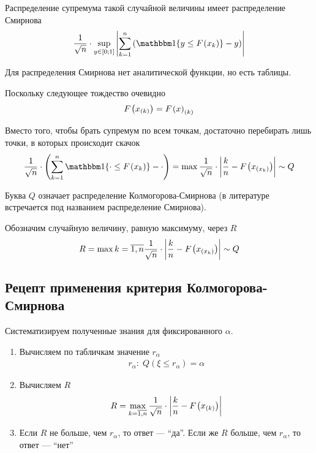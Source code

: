 Распределение супремума такой случайной величины имеет распределение Смирнова
\begin{align*}
    \frac{1}{\sqrt{n}} \cdot \sup\limits_{y \in \left[ 0; 1 \right]}
        {\left| \sum_{k=1}^{n} \left( \Indicator{y \le \cdf{x_k}} - y  \right)
        \right|}
\end{align*}

Для распределения Смирнова нет аналитической функции, но есть таблицы.

Поскольку следующее тождество очевидно
\begin{align*}
    F_{}\left(x_{\left( k \right)}\right) = F_{}\left(x\right)_{\left( k \right)}
\end{align*}

Вместо того, чтобы брать супремум по всем точкам, достаточно перебирать лишь
точки, в которых происходит скачок
\begin{align*}
    \frac{1}{\sqrt{n}} \cdot \left(
        \sum_{k=1}^{n}\Indicator{\cdot \le \cdf{x_k}} - \cdot \right)
    = \max{\frac{1}{\sqrt{n}} \cdot \left| \frac{k}{n}
        - \cdf{x_{\left( x_k \right)}} \right|}
    \sim Q
\end{align*}

Буква $Q$ означает распределение Колмогорова-Смирнова (в литературе встречается
под названием распределение Смирнова).

Обозначим случайную величину, равную максимуму, через $R$
\begin{align*}
    R = \max\limits{k=\overline{1,n}}{
        \frac{1}{\sqrt{n}} \cdot \left| \frac{k}{n}
            - F_{}\left(x_{\left( x_k \right)}\right) \right|}
    \sim Q
\end{align*}

\subsection{Рецепт применения критерия Колмогорова-Смирнова}

Систематизируем полученные знания для фиксированного $\alpha$.

\begin{enumerate}
    \item Вычисляем по табличкам значение $r_{\alpha}$
        \begin{align*}
            r_{\alpha}:\; Q\left( \xi \le r_{\alpha} \right) = \alpha
        \end{align*}
    \item Вычисляем $R$
        \begin{align*}
            R = \max\limits_{k=\overline{1,n}}{
                \frac{1}{\sqrt{n}} \cdot \left| \frac{k}{n}
                    - F_{}\left(x_{\left( k \right)}\right) \right|}
        \end{align*}
    \item Если $R$ не больше, чем $r_{\alpha}$, то ответ --- ``да''.
        Если же $R$ больше, чем $r_{\alpha}$, то ответ --- ``нет''
\end{enumerate}


